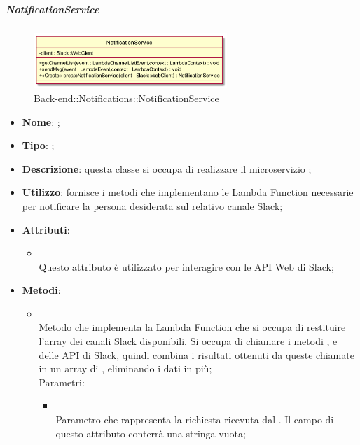 \hypertarget{NotificationService_label}{\subparagraph{NotificationService}}
\begin{figure}[h]
	\centering
	\includegraphics[width=0.65\textwidth,height=\textheight,keepaspectratio]{images/ClassNotificationService.png}
	\caption{Back-end::Notifications::NotificationService}
\end{figure}
\begin{itemize}
	\item \textbf{Nome}: ;
	\item \textbf{Tipo}: ;
	\item \textbf{Descrizione}: questa classe si occupa di realizzare il microservizio ;
	\item \textbf{Utilizzo}: fornisce i metodi che implementano le Lambda Function necessarie per notificare la persona desiderata sul relativo canale Slack;
	\item \textbf{Attributi}:
	\begin{itemize}
		\item[]  \\
		Questo attributo è utilizzato per interagire con le API Web di Slack;
	\end{itemize}
	\item \textbf{Metodi}:
	\begin{itemize}
		\item[]  \\		Metodo che implementa la Lambda Function che si occupa di restituire l'array dei canali Slack disponibili. Si occupa di chiamare i metodi ,  e  delle API di Slack, quindi combina i risultati ottenuti da queste chiamate in un array di , eliminando i dati in più;\\
		Parametri:
		\begin{itemize}
			\item {} \\
			Parametro che rappresenta la richiesta ricevuta dal . Il campo  di questo attributo conterrà una stringa vuota;

\end{itemize}
\end{itemize}
\end{itemize}
